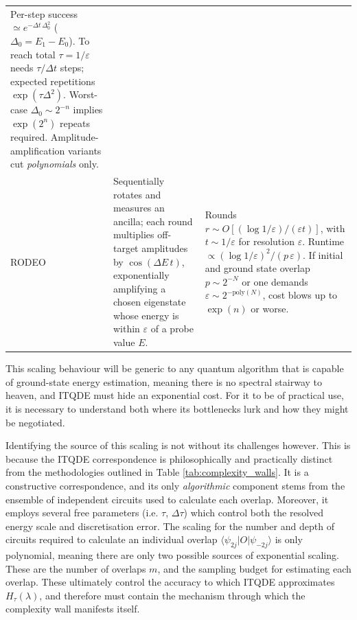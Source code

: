 \documentclass[reprint, aps,prx,showpacs,bibfootnote,preprintnumbers, mathtools, superscriptaddress, amsmath,amssymb]{revtex4-2}
\begin{document}
\begin{table}[hbt!]
\begin{ruledtabular}
\begin{tabular}{p{2.8cm}p{5.1cm}p{5.1cm}}
Per-step success $\simeq\!e^{-\Delta t\,\Delta_0^2}$ ($\Delta_0=E_1-E_0$).  To reach total $\tau=1/\varepsilon$ needs $\tau/\Delta t$ steps; expected repetitions $\exp(\tau\Delta^{2})$. Worst-case $\Delta_0 \sim2^{-n}$ implies $\exp(2^{n})$ repeats required.  Amplitude-amplification variants cut \emph{polynomials} only. \\[4pt]
%
RODEO\,\cite{choi_rodeo_2021,cohen_optimizing_2023} &
Sequentially rotates and measures an ancilla; each round multiplies off-target amplitudes by $\cos(\Delta E\,t)$, exponentially amplifying a chosen eigenstate whose energy is within $\varepsilon$ of a probe value $E$. &
Rounds $r\!\sim\!O[(\log1/\varepsilon)/(\varepsilon t)]$, with $t\!\sim\!1/\varepsilon$ for resolution $\varepsilon$.  Runtime $\propto(\log1/\varepsilon)^{2}/(p\,\varepsilon)$.  If initial and ground state overlap $p\!\sim\!2^{-N}$ or one demands $\varepsilon\!\sim\!2^{-\mathrm{poly}(N)}$, cost blows up to $\exp(n)$ or worse.  \\
\end{tabular}
\end{ruledtabular}
\end{table}


This scaling behaviour will be generic to any quantum algorithm that is capable of ground-state energy estimation, meaning there is no spectral stairway to heaven, and ITQDE must hide an exponential cost. For it to be of practical use, it is necessary to understand both where its bottlenecks lurk and how they might be negotiated.

Identifying the source of this scaling is not without its challenges however. This is because the ITQDE correspondence is philosophically and practically distinct from the methodologies outlined in Table \ref{tab:complexity_walls}. It is a constructive correspondence, and its only \textit{algorithmic} component stems from the ensemble of independent circuits used to calculate each overlap. Moreover, it employs several free parameters (i.e. $\tau$, $\Delta \tau$) which control both the resolved energy scale and discretisation error. The scaling for the number and depth of circuits required to calculate an individual overlap $\langle\psi_{2j}|O|\psi_{-2j}\rangle$ is only polynomial, meaning there are only two possible sources of exponential scaling. These are the number of overlaps $m$, and the sampling budget for estimating each overlap. These ultimately control the accuracy to which ITQDE approximates $H_\tau (\lambda)$, and therefore must contain the mechanism through which the complexity wall manifests itself.
\end{document}
